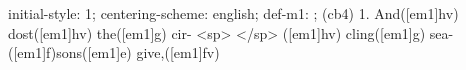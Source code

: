 initial-style: 1;
centering-scheme: english;
def-m1: \grealign;
(cb4) 1. And([em1]hv) dost([em1]hv) the([em1]g) cir- <sp> </sp> ([em1]hv) cling([em1]g) sea-([em1]f)sons([em1]e) give,([em1]fv)